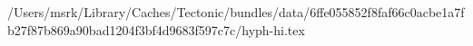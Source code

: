 /Users/msrk/Library/Caches/Tectonic/bundles/data/6ffe055852f8faf66c0acbe1a7fb27f87b869a90bad1204f3bf4d9683f597c7c/hyph-hi.tex
